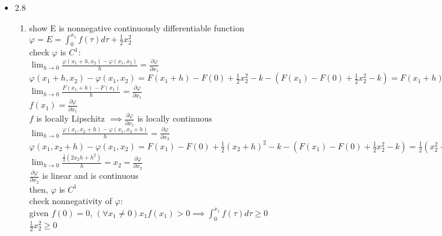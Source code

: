 \documentclass[12pt,letter]{article}
\begin{document}
\begin{itemize}
    then, all energy sublevel sets are positively invariant\\
    
    \pagebreak
    
  \item 2.8\\

    \begin{enumerate}
    \item show E is nonnegative continuously differentiable function\\
      
      $\varphi=E=\int_{0}^{x_1} f(\tau) d \tau + \frac{1}{2}x_2^2$\\

      check $\varphi$ is $C^1$:\\
      
      $\lim_{h \to 0} \frac{\varphi(x_1+h,x_2)-\varphi(x_1,x_2)}{h}=\frac{ \partial \varphi}{\partial x_1}$\\
      $\varphi(x_1+h,x_2)-\varphi(x_1,x_2)=F(x_1+h)-F(0)+\frac{1}{2}x_2^2-k-(F(x_1)-F(0)+\frac{1}{2}x_2^2-k)=F(x_1+h)-F(x_1)$\\
      $\lim_{h \to 0}\frac{F(x_1+h)-F(x_1)}{h}=\frac{ \partial \varphi}{\partial x_1}$\\
      $f(x_1)=\frac{ \partial \varphi}{\partial x_1}$\\
      $f$ is locally Lipschitz $\implies \frac{ \partial \varphi}{\partial x_1}$ is locally continuous\\
      
      $\lim_{h \to 0} \frac{\varphi(x_1,x_2+h)-\varphi(x_1,x_2+h)}{h}=\frac{ \partial \varphi}{\partial x_2}$\\
      $\varphi(x_1,x_2+h)-\varphi(x_1,x_2)=F(x_1)-F(0)+\frac{1}{2} (x_2+h)^2-k-(F(x_1)-F(0)+\frac{1}{2} x_2^2-k)=\frac{1}{2}(x_2^2+2x_2h+h^2 - x_2^2)=\frac{1}{2}(2x_2h+h^2)$\\
      $\lim_{h \to 0} \frac{\frac{1}{2}(2x_2h+h^2)}{h}=x_2=\frac{ \partial \varphi}{\partial x_2}$\\
      $\frac{\partial \varphi}{\partial x_2}$ is linear and is continuous\\

      then, $\varphi$ is $C^1$\\

      check nonnegativity of $\varphi$:\\
      
      given $f(0)=0$, $(\forall x_1 \neq 0) x_1f(x_1)>0 \implies \int_{0}^{x_1} f(\tau) d \tau \geq 0$\\
      $\frac{1}{2}x_2^2 \geq 0$\\
      

\end{enumerate}
\end{itemize}
\end{document}
